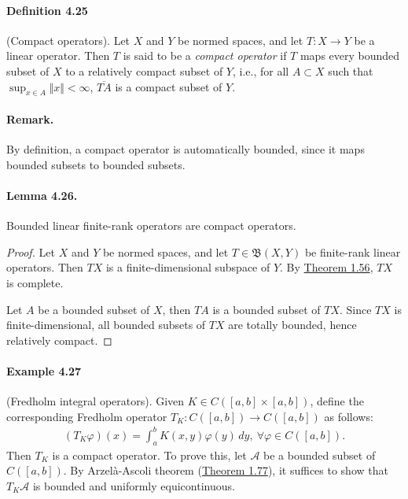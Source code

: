 \documentclass{article}
\begin{document}
\paragraph{Definition 4.25\label{def:4.25}} (Compact operators). Let $X$ and $Y$ be normed spaces, and let $T:X\to Y$ be a linear operator. Then $T$ is said to be a \textit{compact operator} if $T$ maps every bounded subset of $X$ to a relatively compact subset of $Y$, i.e., for all $A\subset X$ such that $\sup_{x\in A}\Vert x\Vert < \infty$, $\overline{TA}$ is a compact subset of $Y$.

\paragraph{Remark.} By definition, a compact operator is automatically bounded, since it maps bounded subsets to bounded subsets.

\paragraph{Lemma 4.26.\label{lemma:4.26}} Bounded linear finite-rank operators are compact operators.
\begin{proof}
Let $X$ and $Y$ be normed spaces, and let $T\in\mathfrak{B}(X,Y)$ be finite-rank linear operators. Then $TX$ is a finite-dimensional subspace of $Y$. By \hyperref[thm:1.56]{Theorem 1.56}, $TX$ is complete.

Let $A$ be a bounded subset of $X$, then $TA$ is a bounded subset of $TX$. Since $TX$ is finite-dimensional, all bounded subsets of $TX$ are totally bounded, hence relatively compact.
\end{proof}

\paragraph{Example 4.27} (Fredholm integral operators). Given $K\in C([a,b]\times[a,b])$, define the corresponding Fredholm operator $T_K:C([a,b])\to C([a,b])$ as follows:
\begin{align*}
	(T_K\varphi)(x)=\int_a^b K(x,y)\varphi(y)\,dy,\ \forall \varphi\in C([a,b]).
\end{align*}
Then $T_K$ is a compact operator. To prove this, let $\mathcal{A}$ be a bounded subset of $C([a,b])$. By Arzelà-Ascoli theorem (\hyperref[thm:1.77]{Theorem 1.77}), it suffices to show that $T_K\mathcal{A}$ is bounded and uniformly equicontinuous. 
\end{document}
